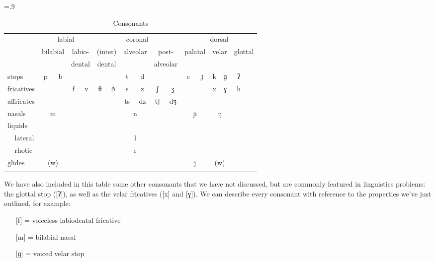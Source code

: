 \begin{refsection}
\begin{table}
\small\tabcolsep=.9\tabcolsep
\begin{tabular}{ll cc cc cc cc cc cc cc cc}
    \lsptoprule
    &              & \multicolumn{4}{c}{labial} & \multicolumn{6}{c}{coronal} & \multicolumn{6}{c}{dorsal} \\ \cmidrule(lr){3-6}\cmidrule(lr){7-12}\cmidrule(lr){13-18}
    &              & \multicolumn{2}{c}{{bilabial}} & \multicolumn{2}{c}{labio-} & \multicolumn{2}{c}{(inter)} & \multicolumn{2}{c}{alveolar} & \multicolumn{2}{c}{post-} & \multicolumn{2}{c}{palatal} & \multicolumn{2}{c}{velar} & \multicolumn{2}{c}{glottal} \\
    &              & & &\multicolumn{2}{c}{dental}&\multicolumn{2}{c}{dental} &&& \multicolumn{2}{c}{alveolar}&&&&&&\\\midrule
    \multicolumn{2}{l}{stops}      & p&b&&&&&t&d&&&c&ɟ&k&ɡ&ʔ&\\
    \multicolumn{2}{l}{fricatives} & &&f&v&θ&ð&s&z&ʃ&ʒ&&&x&ɣ&h&\\
    \multicolumn{2}{l}{affricates} & &&&&&&ts&dz&tʃ&dʒ&&&&&&\\
    \multicolumn{2}{l}{nasals}     & \multicolumn{2}{c}{m}&&&&&\multicolumn{2}{c}{n}&&&\multicolumn{2}{c}{ɲ}&\multicolumn{2}{c}{ŋ}&&\\
    \multicolumn{2}{l}{liquids}   & \\
    &             lateral&&&&&&&\multicolumn{2}{c}{l}&&&&&&&&\\
    &             rhotic&&&&&&&\multicolumn{2}{c}{r}&&&&&&&&\\
    \multicolumn{2}{l}{glides}     & \multicolumn{2}{c}{(w)}&&&&&&&&&\multicolumn{2}{c}{j}&\multicolumn{2}{c}{(w)}&&\\
    \lspbottomrule
\end{tabular}
\caption{Consonants}
\label{tab:conschart}
\end{table}

We have also included in this table some other consonants that we have not discussed, but are commonly featured in linguistics problems: the glottal stop ([{ʔ}]), as well as the velar fricatives ([{x}] and [{ɣ}]). We can describe every consonant with reference to the properties we've just outlined, for example:

\begin{itemize}

    \item[] [{f}] = voiceless labiodental fricative
    \item[] [{m}] = bilabial nasal
    \item[] [{ɡ}] = voiced velar stop
\end{itemize}


\end{refsection}
